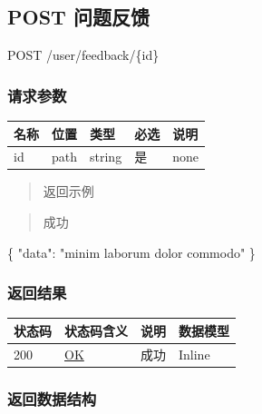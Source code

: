 \documentclass[
]{article}
\newenvironment{Shaded}{}{}
\newcommand{\DataTypeTok}[1]{\textcolor[rgb]{0.56,0.13,0.00}{#1}}
\newcommand{\FunctionTok}[1]{\textcolor[rgb]{0.02,0.16,0.49}{#1}}
\newcommand{\StringTok}[1]{\textcolor[rgb]{0.25,0.44,0.63}{#1}}
\begin{document}
\hypertarget{post-ux95eeux9898ux53cdux9988}{%
\subsection{POST 问题反馈}\label{post-ux95eeux9898ux53cdux9988}}

POST /user/feedback/\{id\}

\hypertarget{ux8bf7ux6c42ux53c2ux6570-38}{%
\subsubsection{请求参数}\label{ux8bf7ux6c42ux53c2ux6570-38}}

\begin{longtable}[]{@{}lllll@{}}
\toprule
名称 & 位置 & 类型 & 必选 & 说明 \\
\midrule
\endhead
id & path & string & 是 & none \\
\bottomrule
\end{longtable}

\begin{quote}
返回示例
\end{quote}

\begin{quote}
成功
\end{quote}

\begin{Shaded}
\begin{Highlighting}[]
\FunctionTok{\{}
  \DataTypeTok{"data"}\FunctionTok{:} \StringTok{"minim laborum dolor commodo"}
\FunctionTok{\}}
\end{Highlighting}
\end{Shaded}

\hypertarget{ux8fd4ux56deux7ed3ux679c-40}{%
\subsubsection{返回结果}\label{ux8fd4ux56deux7ed3ux679c-40}}

\begin{longtable}[]{@{}llll@{}}
\toprule
状态码 & 状态码含义 & 说明 & 数据模型 \\
\midrule
\endhead
200 & \href{https://tools.ietf.org/html/rfc7231\#section-6.3.1}{OK} &
成功 & Inline \\
\bottomrule
\end{longtable}

\hypertarget{ux8fd4ux56deux6570ux636eux7ed3ux6784-32}{%
\subsubsection{返回数据结构}\label{ux8fd4ux56deux6570ux636eux7ed3ux6784-32}}
\end{document}
